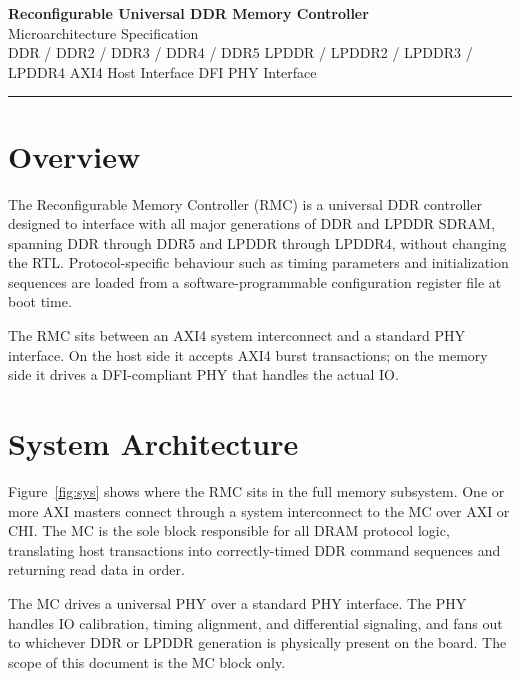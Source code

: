 \documentclass[10pt]{article}
\begin{document}
\begin{center}
  {\Large\bfseries\color{NavyD} Reconfigurable Universal DDR Memory Controller}\\[4pt]
  {\normalsize\color{MGRAY} Microarchitecture Specification}\\[2pt]
  {\small\color{MGRAY} DDR / DDR2 / DDR3 / DDR4 / DDR5 \quad LPDDR / LPDDR2 / LPDDR3 / LPDDR4
  \quad AXI4 Host Interface \quad DFI PHY Interface}
\end{center}
\vspace{4pt}\textcolor{MGRAY}{\rule{\linewidth}{0.4pt}}\vspace{8pt}

\section{Overview}

The Reconfigurable Memory Controller (RMC) is a universal DDR
controller designed to interface with all major generations of DDR
and LPDDR SDRAM, spanning DDR through DDR5 and LPDDR through
LPDDR4, without changing the RTL. Protocol-specific behaviour
such as timing parameters and initialization sequences are loaded from a software-programmable
configuration register file at boot time.

The RMC sits between an AXI4 system interconnect and a standard
PHY interface. On the host side it accepts AXI4 burst transactions;
on the memory side it drives a DFI-compliant PHY that handles the
actual IO.

\section{System Architecture}

Figure~\ref{fig:sys} shows where the RMC sits in the full memory
subsystem. One or more AXI masters connect through a system
interconnect to the MC over AXI or CHI. The MC is the sole block
responsible for all DRAM protocol logic, translating host
transactions into correctly-timed DDR command sequences and
returning read data in order.

The MC drives a universal PHY over a standard PHY interface. The
PHY handles IO calibration, timing alignment, and differential
signaling, and fans out to whichever DDR or LPDDR generation is
physically present on the board. The scope of this document is
the MC block only.
\end{document}
